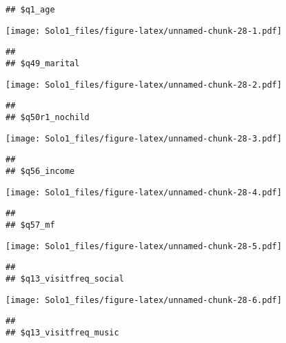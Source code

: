 \documentclass[]{article}
\newenvironment{Shaded}{\begin{snugshade}}{\end{snugshade}}
\newcommand{\KeywordTok}[1]{\textcolor[rgb]{0.13,0.29,0.53}{\textbf{#1}}}
\newcommand{\DataTypeTok}[1]{\textcolor[rgb]{0.13,0.29,0.53}{#1}}
\newcommand{\StringTok}[1]{\textcolor[rgb]{0.31,0.60,0.02}{#1}}
\newcommand{\OperatorTok}[1]{\textcolor[rgb]{0.81,0.36,0.00}{\textbf{#1}}}
\newcommand{\NormalTok}[1]{#1}
\begin{document}
\begin{Shaded}
\end{Shaded}

\begin{verbatim}
## $q1_age
\end{verbatim}

\texttt{[image: Solo1\_files/figure-latex/unnamed-chunk-28-1.pdf]}

\begin{verbatim}
## 
## $q49_marital
\end{verbatim}

\texttt{[image: Solo1\_files/figure-latex/unnamed-chunk-28-2.pdf]}

\begin{verbatim}
## 
## $q50r1_nochild
\end{verbatim}

\texttt{[image: Solo1\_files/figure-latex/unnamed-chunk-28-3.pdf]}

\begin{verbatim}
## 
## $q56_income
\end{verbatim}

\texttt{[image: Solo1\_files/figure-latex/unnamed-chunk-28-4.pdf]}

\begin{verbatim}
## 
## $q57_mf
\end{verbatim}

\texttt{[image: Solo1\_files/figure-latex/unnamed-chunk-28-5.pdf]}

\begin{verbatim}
## 
## $q13_visitfreq_social
\end{verbatim}

\texttt{[image: Solo1\_files/figure-latex/unnamed-chunk-28-6.pdf]}

\begin{verbatim}
## 
## $q13_visitfreq_music
\end{verbatim}
\end{document}
